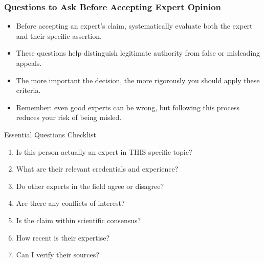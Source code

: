 \documentclass{beamer}
\begin{document}
	\begin{frame}
		\frametitle{Questions to Ask Before Accepting Expert Opinion}
		\begin{itemize}
			\item Before accepting an expert's claim, systematically evaluate both the expert and their specific assertion.
			\item These questions help distinguish legitimate authority from false or misleading appeals.
			\item The more important the decision, the more rigorously you should apply these criteria.
			\item Remember: even good experts can be wrong, but following this process reduces your risk of being misled.
		\end{itemize}
		
		\begin{block}{Essential Questions Checklist}
			\scriptsize
			\begin{enumerate}
				\item Is this person actually an expert in THIS specific topic?
				\item What are their relevant credentials and experience?
				\item Do other experts in the field agree or disagree?
				\item Are there any conflicts of interest?
				\item Is the claim within scientific consensus?
				\item How recent is their expertise?
				\item Can I verify their sources?
			\end{enumerate}
		\end{block}
	\end{frame}
	
\end{document}
